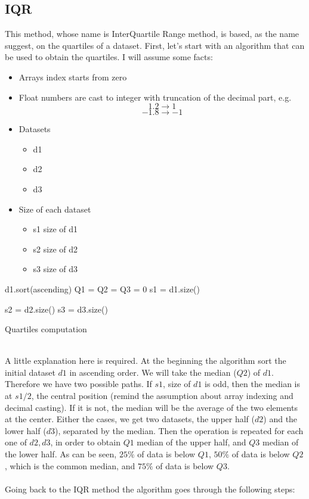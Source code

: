 \documentclass[12pt,twoside]{report}
\begin{document}
\subsection{IQR}
This method, whose name is InterQuartile Range method, is based, as the name suggest, on the quartiles of a dataset. First, let's start with an algorithm that can be used to obtain the quartiles. I will assume some facts:
\begin{itemize}
    \item Arrays index starts from zero
    \item Float numbers are cast to integer with truncation of the decimal part, e.g.
    $$1.2 \to 1$$
    $$-1.8 \to -1$$
    \item Datasets
    \begin{itemize}
        \item d1
        \item d2
        \item d3
    \end{itemize}
    \item Size of each dataset
    \begin{itemize}
        \item s1
        \subitem size of d1
        \item s2
        \subitem size of d2
        \item s3
        \subitem size of d3
    \end{itemize}
\end{itemize}

\begin{algorithm}[H]
\SetAlgoLined
{}
d1.sort(ascending)\;
Q1 = Q2 = Q3 = 0\;
s1 = d1.size()\;

s2 = d2.size()\;
s3 = d3.size()\;
 \caption{Quartiles computation}
\end{algorithm}
\noindent \\A little explanation here is required. At the beginning the algorithm sort the initial dataset $d1$ in ascending order. We will take the median ($Q2$) of $d1$. Therefore we have two possible paths. If $s1$, size of $d1$ is odd, then the median is at $s1/2$, the central position (remind the assumption about array indexing and decimal casting). If it is not, the median will be the average of the two elements at the center. Either the cases, we get two datasets, the upper half ($d2$) and the lower half ($d3$), separated by the median. Then the operation is repeated for each one of $d2,d3$, in order to obtain $Q1$ median of the upper half, and $Q3$ median of the lower half. As can be seen, $25\%$ of data is below $Q1$, $50\%$ of data is below $Q2$, which is the common median, and $75\%$ of data is below $Q3$. \\\\Going back to the IQR method the algorithm goes through the following steps:
\end{document}

